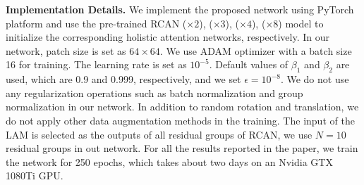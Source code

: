 \documentclass[runningheads]{llncs}
\begin{document}
\textbf{Implementation Details.} We implement the proposed network using PyTorch platform and use the pre-trained RCAN ($ \times 2 $), ($ \times 3 $), ($ \times 4 $), ($ \times 8 $) model to initialize the corresponding holistic attention networks, respectively. 
In our network, patch size is set as $ 64 \times 64 $. We use
ADAM \cite{kingma2014adam} optimizer with a batch size 16 for training. The
learning rate is set as $ 10^{-5} $.
Default values of $ \beta_{1}$ and $\beta_{2}$ are used, which are 0.9 and 0.999, respectively, and we set $ \epsilon=10^{-8} $.
We do not use any regularization operations such as batch normalization and group normalization in our network. In addition to random rotation and translation, we do not apply other data augmentation methods in the training.
The input of the LAM is selected as the outputs of all residual groups of RCAN, we use $N=10$ residual groups in out network. 
For all the results reported in the paper, we train the network for  
250 epochs, which takes about two days on an Nvidia GTX 1080Ti GPU.
\end{document}
